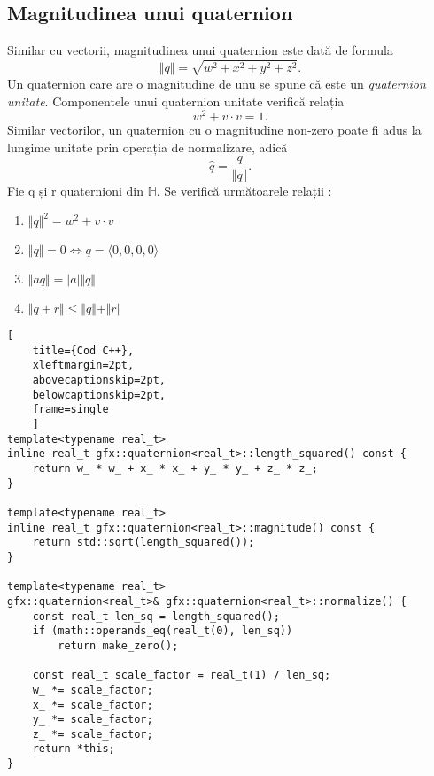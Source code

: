 \subsection{Magnitudinea unui quaternion}
\label{ch1:quaternions:magnitude}
Similar cu vectorii, magnitudinea unui quaternion este dată de formula
\begin{equation}
\Vert q \Vert = \sqrt{w^2 + x^2 + y^2 + z^2}.
\end{equation}
Un quaternion care are o magnitudine de unu se spune că este un
\textit{quaternion unitate}. Componentele unui quaternion unitate verifică
relația
\begin{equation}
w^2 + v \cdot v = 1.
\end{equation}
Similar vectorilor, un quaternion cu o magnitudine
non-zero poate fi adus la lungime unitate prin operația de normalizare, adică
\begin{equation}
\hat{q} = \frac{q}{\Vert q \Vert}.
\end{equation}
Fie q și r quaternioni din $\mathbb{H}$. Se verifică următoarele relații :
\begin{enumerate}
    \item $\Vert q \Vert ^ 2 = w^2 + v \cdot v$
    \item $\Vert q \Vert = 0 \iff q = \langle 0, 0, 0, 0 \rangle$
    \item $\Vert \mathit{a}q \Vert = \vert \mathit{a} \vert \Vert q \Vert$
    \item $\Vert q + r \Vert \leq \Vert q \Vert + \Vert r \Vert$
\end{enumerate}

\begin{lstlisting}[
    title={Cod C++}, 
    xleftmargin=2pt,
    abovecaptionskip=2pt,
    belowcaptionskip=2pt,
    frame=single
    ]
template<typename real_t>
inline real_t gfx::quaternion<real_t>::length_squared() const {
    return w_ * w_ + x_ * x_ + y_ * y_ + z_ * z_;
}

template<typename real_t>
inline real_t gfx::quaternion<real_t>::magnitude() const {
    return std::sqrt(length_squared());
}

template<typename real_t>
gfx::quaternion<real_t>& gfx::quaternion<real_t>::normalize() {
    const real_t len_sq = length_squared();
    if (math::operands_eq(real_t(0), len_sq))
        return make_zero();

    const real_t scale_factor = real_t(1) / len_sq;
    w_ *= scale_factor; 
    x_ *= scale_factor; 
    y_ *= scale_factor; 
    z_ *= scale_factor;
    return *this;
}
\end{lstlisting}

